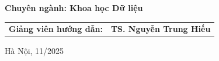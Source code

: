 \begin{center}
    \vspace{0.5cm}
    \textbf{Chuyên ngành: Khoa học Dữ liệu} \\

  \vspace{1.5cm}
  \begin{tabular}{l l}
    \textbf{Giảng viên hướng dẫn:} & \textbf{TS. Nguyễn Trung Hiếu} \hspace{2.15cm} 
  \end{tabular}

  \vspace{1.5cm}
  \fontsize{14pt}{17pt}\selectfont Hà Nội, 11/2025
\end{center}

\cleardoublepage
